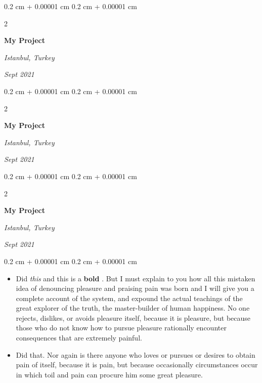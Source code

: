 \documentclass[10pt, letterpaper]{article}
\newenvironment{highlights}{
    \begin{itemize}[
        topsep=0.10 cm,
        parsep=0.10 cm,
        partopsep=0pt,
        itemsep=0pt,
        leftmargin=0.4 cm + 10pt
    ]
}{
    \end{itemize}
} %
\newenvironment{onecolentry}{
    \begin{adjustwidth}{
        0.2 cm + 0.00001 cm
    }{
        0.2 cm + 0.00001 cm
    }
}{
    \end{adjustwidth}
} %
\newenvironment{twocolentry}[2][]{
    \onecolentry
    \def\secondColumn{#2}
    \setcolumnwidth{\fill, 4.5 cm}
    \begin{paracol}{2}
}{
    \switchcolumn \raggedleft \secondColumn
    \end{paracol}
    \endonecolentry
} %
\let\hrefWithoutArrow\href
\renewcommand{\href}[2]{\hrefWithoutArrow{#1}{\ifthenelse{\equal{#2}{}}{ }{#2 }\raisebox{.15ex}{\footnotesize \faExternalLink*}}}
\begin{document}
        \vspace{0.2 cm}

        \begin{twocolentry}{
        \textit{Istanbul, Turkey}    
            
        \textit{Sept 2021}}
            \textbf{My Project}
        \end{twocolentry}



        \vspace{0.2 cm}

        \begin{twocolentry}{
        \textit{Istanbul, Turkey}    
            
        \textit{Sept 2021}}
            \textbf{My Project}
        \end{twocolentry}



        \vspace{0.2 cm}

        \begin{twocolentry}{
        \textit{Istanbul, Turkey}    
            
        \textit{Sept 2021}}
            \textbf{My Project}
        \end{twocolentry}

        \vspace{0.10 cm}
        \begin{onecolentry}
            \begin{highlights}
                \item Did \textit{this} and this is a \textbf{bold} \href{https://example.com}{link}. But I must explain to you how all this mistaken idea of denouncing pleasure and praising pain was born and I will give you a complete account of the system, and expound the actual teachings of the great explorer of the truth, the master-builder of human happiness. No one rejects, dislikes, or avoids pleasure itself, because it is pleasure, but because those who do not know how to pursue pleasure rationally encounter consequences that are extremely painful.
                \item Did that. Nor again is there anyone who loves or pursues or desires to obtain pain of itself, because it is pain, but because occasionally circumstances occur in which toil and pain can procure him some great pleasure.
            \end{highlights}
        \end{onecolentry}
\end{document}
